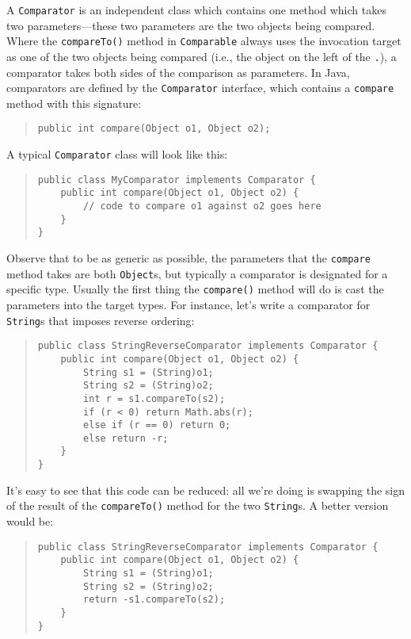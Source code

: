 \documentclass[12pt]{article}
\begin{document}
A \texttt{Comparator} is an independent class which contains one
method which takes two parameters---these two parameters are the two
objects being compared.  Where the \texttt{compareTo()} method in
\texttt{Comparable} always uses the invocation target as one of the
two objects being compared (i.e., the object on the left of the
\texttt{.}), a comparator takes both sides of the comparison as
parameters.  In Java, comparators are defined by the
\texttt{Comparator} interface, which contains a \texttt{compare}
method with this signature:
\begin{quote}
\begin{verbatim}
public int compare(Object o1, Object o2);
\end{verbatim}
\end{quote}

A typical \texttt{Comparator} class will look like this:
\begin{quote}
\begin{verbatim}
public class MyComparator implements Comparator {
    public int compare(Object o1, Object o2) {
        // code to compare o1 against o2 goes here
    }
}
\end{verbatim}
\end{quote}

Observe that to be as generic as possible, the parameters that the
\texttt{compare} method takes are both \texttt{Object}s, but typically
a comparator is designated for a specific type.  Usually the first
thing the \texttt{compare()} method will do is cast the parameters
into the target types.  For instance, let's write a comparator for
\texttt{String}s that imposes reverse ordering:
\begin{quote}
\begin{verbatim}
public class StringReverseComparator implements Comparator {
    public int compare(Object o1, Object o2) {
        String s1 = (String)o1;
        String s2 = (String)o2;
        int r = s1.compareTo(s2);
        if (r < 0) return Math.abs(r);
        else if (r == 0) return 0;
        else return -r;
    }
}
\end{verbatim}
\end{quote}

It's easy to see that this code can be reduced: all we're doing is
swapping the sign of the result of the \texttt{compareTo()} method for
the two \texttt{String}s.  A better version would be:
\begin{quote}
\begin{verbatim}
public class StringReverseComparator implements Comparator {
    public int compare(Object o1, Object o2) {
        String s1 = (String)o1;
        String s2 = (String)o2;
        return -s1.compareTo(s2);
    }
}
\end{verbatim}
\end{quote}
\end{document}
